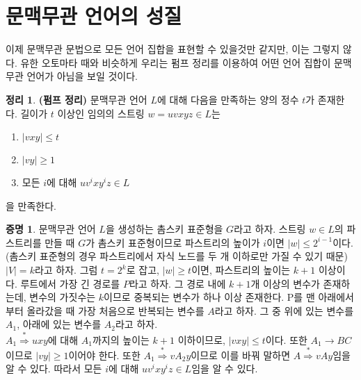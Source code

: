 \documentclass[b5paper]{book}
\theoremstyle{definition}
\newtheorem{thm}{정리}[chapter]
\newtheorem*{pf}{증명}
\begin{document}
\section{문맥무관 언어의 성질}
이제 문맥무관 문법으로 모든 언어 집합을 표현할 수 있을것만 같지만, 이는 그렇지 않다. 
유한 오토마타 때와 비슷하게 우리는 펌프 정리를 이용하여 어떤 언어 집합이 문맥무관 언어가 
아님을 보일 것이다.
\begin{thm}
\textbf{(펌프 정리)} 문맥무관 언어 $L$에 대해 다음을 만족하는 양의 정수 $t$가 존재한다.
 길이가 $t$ 이상인 임의의 스트링 $w = uvxyz\in L$는
\begin{enumerate}
    \item $\vert vxy \vert \le t$ 
    \item $\vert vy \vert \ge 1$ 
    \item 모든 $i$에 대해 $uv^i xy^i z \in L$
\end{enumerate}
을 만족한다. 
\end{thm}
\begin{pf}
문맥무관 언어 $L$을 생성하는 촘스키 표준형을 $G$라고 하자. 스트링 $w \in L$의 
파스트리를 만들 때 $G$가 촘스키 표준형이므로 파스트리의 높이가 $i$이면 
$\vert w\vert \le 2^{i-1}$이다. (촘스키 표준형의 경우 파스트리에서 
자식 노드를 두 개 이하로만 가질 수 있기 때문) \\ 
$\vert V \vert = k$라고 하자. 그럼 $t = 2^{k}$로 잡고, $\vert w  \vert \ge t$이면, 
파스트리의 높이는 $k+1$ 이상이다. 루트에서 가장 긴 경로를 $P$라고 하자. 
그 경로 내에 $k+1$개 이상의 변수가 존재하는데, 변수의 가짓수는 $k$이므로 
중복되는 변수가 하나 이상 존재한다. P를 맨 아래에서부터 올라갔을 때 가장 
처음으로 반복되는 변수를 $A$라고 하자. 그 중 위에 있는 변수를 $A_1$, 아래에 있는 변수를
$A_2$라고 하자.  \\ 
$A_1 \overset{*}{\Rightarrow} uxy$에 대해 $A_1$까지의 높이는 $k+1$ 이하이므로, 
$\vert vxy\vert \le t$이다. 또한
$A_1 \rightarrow BC$이므로 $\vert vy\vert \ge 1$이어야 한다. 또한 $A_1 \overset{*}{\Rightarrow}
vA_2y $이므로 이를 바꿔 말하면 $A \overset{*}{\Rightarrow} vAy$임을 알 수 있다. 따라서 모든 $i$에 대해
$uv^i x y^i z \in L$임을 알 수 있다. 
\end{pf}
\begin{figure}[!ht]
    \centering
\caption{}
\end{figure}
\end{document}
